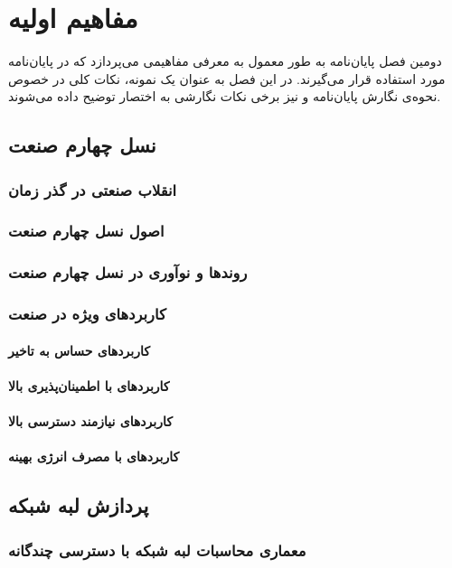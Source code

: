 
\chapter{مفاهیم اولیه}


دومین فصل پایان‌نامه به طور معمول به معرفی مفاهیمی می‌پردازد که در پایان‌نامه مورد استفاده قرار می‌گیرند.
در این فصل به عنوان یک نمونه، نکات کلی در خصوص نحوه‌ی نگارش پایان‌نامه
و نیز برخی نکات نگارشی به اختصار توضیح داده می‌شوند.

\section{نسل چهارم صنعت}

\subsection{انقلاب صنعتی در گذر زمان}
\subsection{اصول نسل چهارم صنعت}
\subsection{روندها و نوآوری در نسل چهارم صنعت}
\subsection{کاربردهای ویژه در صنعت}
\subsubsection{کاربردهای حساس به تاخیر}
\subsubsection{کاربردهای با اطمینان‌پذیری بالا}
\subsubsection{کاربردهای نیازمند دسترسی بالا}
\subsubsection{کاربردهای با مصرف انرژی بهینه}

\section{پردازش لبه شبکه}
\subsection{معماری محاسبات لبه شبکه با دسترسی چندگانه}
